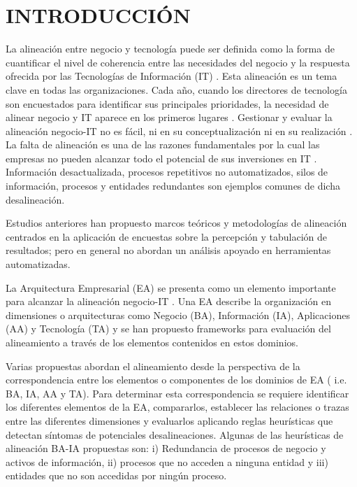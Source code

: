 \chapter{INTRODUCCI\'ON} \label{cha:intro}

La alineaci\'on entre negocio y tecnolog\'ia puede ser definida como la forma de cuantificar el nivel de coherencia entre las necesidades del negocio y la respuesta ofrecida por las Tecnolog\'ias de Informaci\'on (IT) \cite{Pereira:2003}. Esta alineaci\'on es un tema clave en todas las organizaciones. Cada a\~no, cuando los directores de tecnolog\'ia son encuestados para identificar sus principales prioridades, la necesidad de alinear negocio y IT aparece en los primeros lugares \cite{Wang:20082}. Gestionar y evaluar la alineaci\'on negocio-IT no es f\'acil, ni en su conceptualizaci\'on ni en su realizaci\'on \cite{Scott:2005}. La falta de alineaci\'on es una de las razones fundamentales por la cual las empresas no pueden alcanzar todo el potencial de sus inversiones en IT \cite{Cuenca:2010}. Informaci\'on desactualizada, procesos repetitivos no automatizados, silos de informaci\'on, procesos y entidades redundantes son ejemplos comunes de dicha desalineaci\'on. 

Estudios anteriores \cite{henderson:1990, Bergeron:2004, Elhari:2011, Plazaola:2008, Wang:2008} han propuesto marcos te\'oricos y metodolog\'ias de alineaci\'on centrados en la aplicaci\'on de encuestas sobre la percepci\'on y tabulaci\'on de resultados; pero en general no abordan un an\'alisis apoyado en herramientas automatizadas. 

La Arquitectura Empresarial (EA) se presenta como un elemento importante para alcanzar la alineaci\'on negocio-IT \cite{Lankhorst:2004}. Una EA describe la organizaci\'on en dimensiones o arquitecturas como Negocio (BA), Informaci\'on (IA), Aplicaciones (AA) y Tecnolog\'ia (TA) y se han propuesto frameworks para evaluaci\'on del alineamiento a trav\'es de los elementos contenidos en estos dominios.

Varias propuestas \cite{Pereira:2003, Pereira:2005, Sousa:2005, Wegmann:2005, Cuenca:2010} abordan el alineamiento desde la perspectiva de la correspondencia entre los elementos o componentes de los dominios de EA ( i.e. BA, IA, AA y TA). Para determinar esta correspondencia se requiere identificar los diferentes elementos de la EA, compararlos, establecer las relaciones o trazas entre las diferentes dimensiones y evaluarlos aplicando reglas heur\'isticas \cite{Pereira:2003, Pereira:2005, Sousa:2005} que detectan s\'intomas de potenciales desalineaciones. Algunas de las heur\'isticas de alineaci\'on BA-IA propuestas son: i) Redundancia de procesos de negocio y activos de informaci\'on, ii) procesos que no acceden a ninguna entidad y iii) entidades que no son accedidas por ning\'un proceso.

